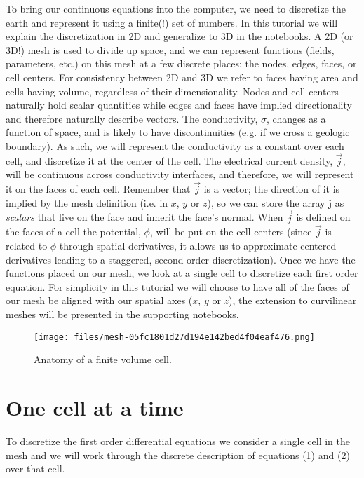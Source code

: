 \documentclass[Journal,InsideFigs,DoubleSpace,12pt,letterpaper]{ascelike-new}
\begin{document}
To bring our continuous equations into the computer, we need to discretize the earth and represent it using a finite(!) set of numbers. In this tutorial we will explain the discretization in 2D and generalize to 3D in the notebooks. A 2D (or 3D!) mesh is used to divide up space, and we can represent functions (fields, parameters, etc.) on this mesh at a few discrete places: the nodes, edges, faces, or cell centers. For consistency between 2D and 3D we refer to faces having area and cells having volume, regardless of their dimensionality. Nodes and cell centers naturally hold scalar quantities while edges and faces have implied directionality and therefore naturally describe vectors. The conductivity, $\sigma$, changes as a function of space, and is likely to have discontinuities (e.g. if we cross a geologic boundary). As such, we will represent the conductivity as a constant over each cell, and discretize it at the center of the cell. The electrical current density, $\vec{j}$, will be continuous across conductivity interfaces, and therefore, we will represent it on the faces of each cell. Remember that $\vec{j}$ is a vector; the direction of it is implied by the mesh definition (i.e. in $x$, $y$ or $z$), so we can store the array $\mathbf{j}$ as \textit{scalars} that live on the face and inherit the face's normal. When $\vec{j}$ is defined on the faces of a cell the potential, $\phi$, will be put on the cell centers (since $\vec{j}$ is related to $\phi$ through spatial derivatives, it allows us to approximate centered derivatives leading to a staggered, second-order discretization). Once we have the functions placed on our mesh, we look at a single cell to discretize each first order equation. For simplicity in this tutorial we will choose to have all of the faces of our mesh be aligned with our spatial axes ($x$, $y$ or $z$), the extension to curvilinear meshes will be presented in the supporting notebooks.

\begin{figure}[!htbp]
\centering
\texttt{[image: files/mesh-05fc1801d27d194e142bed4f04eaf476.png]}
\caption{Anatomy of a finite volume cell.}
\label{fig-mesh}
\end{figure}

\section{One cell at a time}\label{One cell at a time}

To discretize the first order differential equations we consider a single cell in the mesh and we will work through the discrete description of equations (1) and (2) over that cell.
\end{document}
